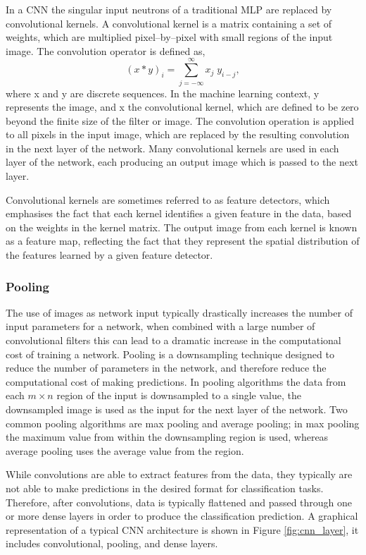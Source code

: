 In a CNN the singular input neutrons of a traditional MLP are replaced by
convolutional kernels. A convolutional kernel is a matrix containing a set of 
weights, which are multiplied pixel--by--pixel with small regions of the input 
image. The convolution operator is defined as, 
\begin{equation}
	\left( x * y \right)_i = \sum_{j = - \infty}^{\infty} x_j \; y_{i-j},
\end{equation}
where x and y are discrete sequences. In the machine learning context, y
represents the image, and x the convolutional kernel, which are defined to be
zero beyond the finite size of the filter or image. The convolution operation 
is applied to all pixels in the input image, which are replaced by the 
resulting convolution in the next layer of the network. Many convolutional 
kernels are used in each layer of the network, each producing an output image 
which is passed to the next layer. 

Convolutional kernels are sometimes referred to as feature detectors, which 
emphasises the fact that each kernel identifies a given feature in the data, 
based on the weights in the kernel matrix. The output image from each kernel 
is known as a feature map, reflecting the fact that they represent the spatial 
distribution of the features learned by a given feature detector. 

\subsubsection*{Pooling}
The use of images as network input typically drastically increases the number of
input parameters for a network, when combined with a large number of
convolutional filters this can lead to a dramatic increase in the computational
cost of training a network. Pooling \cite{5537907} is a downsampling technique 
designed to reduce the number of parameters in the network, and therefore 
reduce the computational cost of making predictions. In pooling algorithms
the data from each $m \times n$ region of the input is downsampled to a single 
value, the downsampled image is used as the input for the next layer of the 
network. Two common pooling algorithms are max pooling and average pooling; in 
max pooling the maximum value from within the downsampling region is used, 
whereas average pooling uses the average value from the region.

\bigskip

While convolutions are able to extract features from the data, they typically
are not able to make predictions in the desired format for classification tasks.
Therefore, after convolutions, data is typically flattened and passed through
one or more dense layers in order to produce the classification prediction. A
graphical representation of a typical CNN architecture is shown in Figure
\ref{fig:cnn_layer}, it includes convolutional, pooling, and dense layers.

